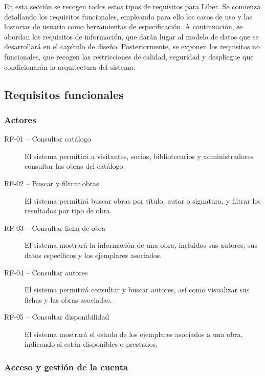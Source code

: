 En esta sección se recogen todos estos tipos de requisitos para Liber. Se comienza detallando los requisitos funcionales, empleando para ello los casos de uso y las historias de usuario como herramientas de especificación. A continuación, se abordan los requisitos de información, que darán lugar al modelo de datos que se desarrollará en el capítulo de diseño. Posteriormente, se exponen los requisitos no funcionales, que recogen las restricciones de calidad, seguridad y despliegue que condicionarán la arquitectura del sistema.

\subsection{Requisitos funcionales}
\subsubsection{Actores}
\begin{description}
	\item[RF-01 -- Consultar catálogo]
	El sistema permitirá a visitantes, socios, bibliotecarios y
	administradores consultar las obras del catálogo.
	
	\item[RF-02 -- Buscar y filtrar obras]
	El sistema permitirá buscar obras por título, autor o signatura, y
	filtrar los resultados por tipo de obra.
	
	\item[RF-03 -- Consultar ficha de obra]
	El sistema mostrará la información de una obra, incluidos sus autores,
	sus datos específicos y los ejemplares asociados.
	
	\item[RF-04 -- Consultar autores]
	El sistema permitirá consultar y buscar autores, así como visualizar
	sus fichas y las obras asociadas.
	
	\item[RF-05 -- Consultar disponibilidad]
	El sistema mostrará el estado de los ejemplares asociados a una obra,
	indicando si están disponibles o prestados.
\end{description}

\subsubsection{Acceso y gestión de la cuenta}


